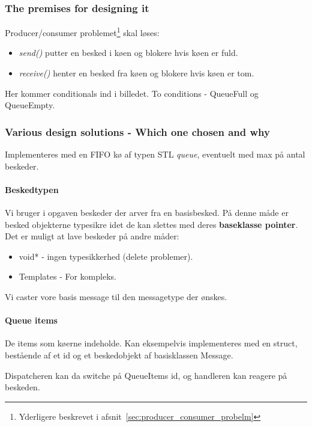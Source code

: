 \subsubsection{The premises for designing it}
Producer/consumer problemet\footnote{Yderligere beskrevet i afsnit~\ref{sec:producer_consumer_probelm}} skal løses:
\begin{itemize}
	\item \textit{send()}
	putter en besked i køen og blokere hvis køen er fuld.
	
	\item \textit{receive()}
	henter en besked fra køen og blokere hvis køen er tom.
\end{itemize}
Her kommer conditionals ind i billedet. To conditions - QueueFull og QueueEmpty.

\subsubsection{Various design solutions - Which one chosen and why}
Implementeres med en FIFO kø af typen STL \textit{queue}, eventuelt med max på antal beskeder.

\paragraph{Beskedtypen}

Vi bruger i opgaven beskeder der arver fra en basisbesked. På denne måde er besked objekterne typesikre idet de kan slettes med deres \textbf{baseklasse pointer}.
Det er muligt at lave beskeder på andre måder:

\begin{itemize}
	\item void* - ingen typesikkerhed (delete problemer).
	
	\item Templates - For kompleks.
\end{itemize}

Vi caster vore basis message til den messagetype der ønskes.

\paragraph{Queue items}

De items som køerne indeholde. Kan eksempelvis implementeres med en struct, bestående af et id og et beskedobjekt af basisklassen Message.

Dispatcheren kan da switche på QueueItems id, og handleren kan  reagere på beskeden.

